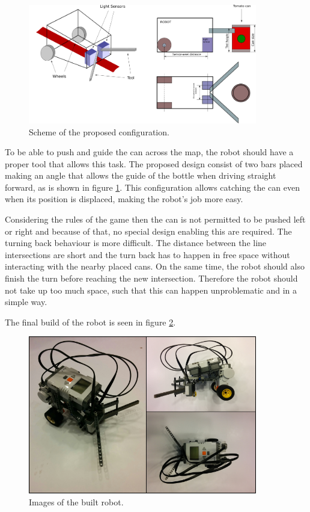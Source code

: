 \documentclass[12pt,a4paper]{article}
\begin{document}
\begin{figure}[H]
\includegraphics[width=10cm]{Fig2.png}
\centering
\caption{Scheme of the proposed configuration.}
\label{fig:robotscheme}
\end{figure}


To be able to push and guide the can across the map, the robot should have a proper tool that allows this task. 
The proposed design consist of two bars placed making an angle that allows the guide of the bottle when driving straight forward, as is shown in figure \ref{fig:robotscheme}.
This configuration allows catching the can even when its position is displaced, making the robot's job more easy.

Considering the rules of the game then the can is not permitted to be pushed left or right and because of that, no special design enabling this are required. 
The turning back behaviour is more difficult. 
The distance between the line intersections are short and the turn back has to happen in free space without interacting with the nearby placed cans.
On the same time, the robot should also finish the turn before reaching the new intersection.
Therefore the robot should not take up too much space, such that this can happen unproblematic and in a simple way.

The final build of the robot is seen in figure \ref{fig:robotImage}.

\begin{figure}[H]
\includegraphics[width=10cm]{Fig1.png}
\centering
\caption{Images of the built robot.}
\label{fig:robotImage}
\end{figure}



\end{document}
